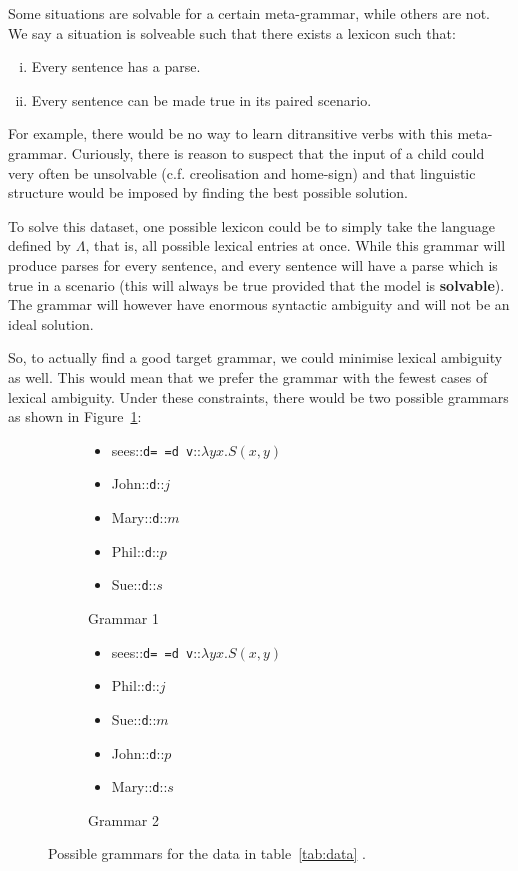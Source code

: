 \documentclass[11pt, a4paper]{article}
\newcommand{\lex}[3]{{#1}::{\texttt{#2}}::{$#3$}}
\begin{document}
\begin{tcolorbox}[colback=red!5!white,colframe=red!75!black,title=Solvable situation sets]
Some situations are solvable for a certain meta-grammar, while others are not. 
We say a situation is solveable such that there exists a lexicon such that: 
\begin{enumerate}[i.]
  \item Every sentence has a parse. 
  \item Every sentence can be made true in its paired scenario.
\end{enumerate}
For example, there would be no way to learn ditransitive verbs with this meta-grammar. 
Curiously, there is reason to suspect that the input of a child could very often be unsolvable (c.f. creolisation and home-sign) and that linguistic structure would be imposed by finding the best possible solution.
\end{tcolorbox}

To solve this dataset, one possible lexicon could be to simply take the language defined by $\Lambda$, that is, all possible lexical entries at once. 
While this grammar will produce parses for every sentence, and every sentence will have a parse which is true in a scenario (this will always be true provided that the model is \textbf{solvable}).
The grammar will however have enormous syntactic ambiguity and will not be an ideal solution.

So, to actually find a good target grammar, we could minimise lexical ambiguity as well.
This would mean that we prefer the grammar with the fewest cases of lexical ambiguity.
Under these constraints, there would be two possible grammars as shown in Figure~\ref{fig:graammar}:

\begin{figure}[htb]
  \begin{subfigure}{0.5\textwidth}
  \begin{itemize}
    \item \lex{sees}{d=~=d~v}{\lambda yx. S(x, y)}
    \item \lex{John}{d}{j}
    \item \lex{Mary}{d}{m}
    \item \lex{Phil}{d}{p}
    \item \lex{Sue}{d}{s}
  \end{itemize}
  \caption{Grammar 1}
  \end{subfigure}
  \begin{subfigure}{0.5\textwidth}
  \begin{itemize}
    \item \lex{sees}{d=~=d~v}{\lambda yx. S(x, y)}
    \item \lex{Phil}{d}{j}
    \item \lex{Sue}{d}{m}
    \item \lex{John}{d}{p}
    \item \lex{Mary}{d}{s}
  \end{itemize}
  \caption{Grammar 2}
  \end{subfigure}

  \caption{Possible grammars for the data in table~\ref{tab:data} \label{fig:graammar}.}
\end{figure}
\end{document}
